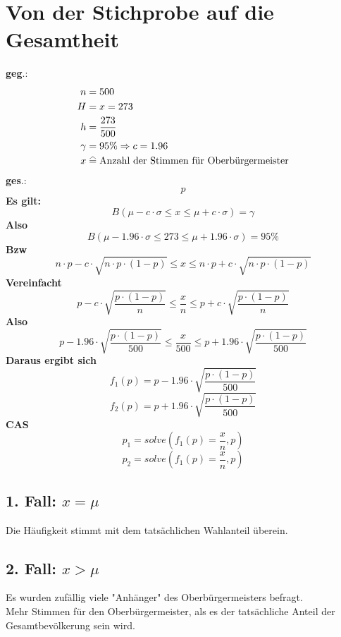 \documentclass[a4paper,12pt]{article}
\newcommand\equalhat{\mathrel{\stackon[1.5pt]{=}{\stretchto{%
    \scalerel*[\widthof{=}]{\wedge}{\rule{1ex}{3ex}}}{0.5ex}}}}
\begin{document}
\section{Von der Stichprobe auf die Gesamtheit}
\textbf{geg}.:
\begin{equation*}
\begin{split}
n & = 500\\
H & = x = 273\\
h & = \frac{273}{500}\\
\gamma & = 95\% \Rightarrow c = 1.96\\
x & \equalhat \text{Anzahl der Stimmen für Oberbürgermeister}
\end{split}
\end{equation*}
\textbf{ges}.:\\
$$p$$
\textbf{Es gilt:}\\
$$B(\mu - c \cdot \sigma \leq x \leq \mu + c \cdot \sigma) = \gamma$$
\textbf{Also}
$$B(\mu - 1.96 \cdot \sigma \leq 273 \leq \mu + 1.96 \cdot \sigma) = 95\%$$
\textbf{Bzw}\\
$$n \cdot p - c \cdot \sqrt{n \cdot p \cdot (1 - p)} \leq x \leq n \cdot p + c \cdot \sqrt{n \cdot p \cdot (1 - p)}$$
\textbf{Vereinfacht}\\
$$p - c \cdot \sqrt{\frac{p \cdot (1 - p)}{n}} \leq \frac{x}{n} \leq p + c \cdot \sqrt{\frac{p \cdot (1 - p)}{n}}$$
\textbf{Also}\\
$$p - 1.96 \cdot \sqrt{\frac{p \cdot (1 - p)}{500}} \leq \frac{x}{500} \leq p + 1.96 \cdot \sqrt{\frac{p \cdot (1 - p)}{500}}$$
\textbf{Daraus ergibt sich}\\
$$f_{1}(p) = p - 1.96 \cdot \sqrt{\frac{p \cdot (1 - p)}{500}}$$
$$f_{2}(p) = p + 1.96 \cdot \sqrt{\frac{p \cdot (1 - p)}{500}}$$
\textbf{CAS}\\
$$p_{1} = solve(f_{1}(p) = \frac{x}{n}, p)$$
$$p_{2} = solve(f_{1}(p) = \frac{x}{n}, p)$$
\subsection*{1. Fall: $x = \mu$}
Die Häufigkeit stimmt mit dem tatsächlichen Wahlanteil überein.\\
\subsection*{2. Fall: $x > \mu$}
Es wurden zufällig viele "Anhänger" des Oberbürgermeisters befragt.\\
Mehr Stimmen für den Oberbürgermeister, als es der tatsächliche Anteil der Gesamtbevölkerung sein wird.\\
\end{document}
